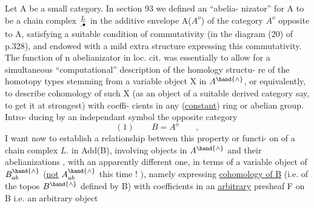 Let A be a small category.  In section 93 we defined an ``abelia-%
nizator'' for A  to be a chain complex  $L\over{,}{\bullet}$  in the additive envelope
A($A^{o}$)  of the category $A^{o}$ opposite to A,   satisfying a
suitable condition of commutativity (in the diagram (20) of p.328),
and endowed with a mild extra structure \inserted{$\lambda$,} expressing this commutativity.
The function of n abelianizator in loc. cit.  was essentially to allow
for a simultaneous ``computational'' description of the homology structu-%
re of the homotopy types stemming from a variable object X in $A^{\hand{\wedge}}$,  or
equivalently,  to describe cohomology of such X (as an object of
a suitable derived category say, to get it at strongest) with coeffi-%
cients in any (\uline{constant})  ring or abelian group.  Intro-%
ducing by an independant symbol the opposite category
\[ (1) \qquad B = A^{o} \qquad , \]
I want now to establish a relationship between this property or functi-%
on of a chain complex  $L.$  in Add(B),   involving objects in $A^{\hand{\wedge}}$
and their abelianizations , with an apparently different one,  in
terms of a variable object of $B^{\hand{\wedge}}_{ab}$  (\uline{not}  $A^{\hand{\wedge}}_{ab}$  this time ! ),  namely
expressing \uline{cohomology of B} (i.e. of the topos $B^{\hand{\wedge}}$ defined by B) with
coefficients in an \uline{arbitrary}  presheaf  F on B  i.e. an arbitrary object

